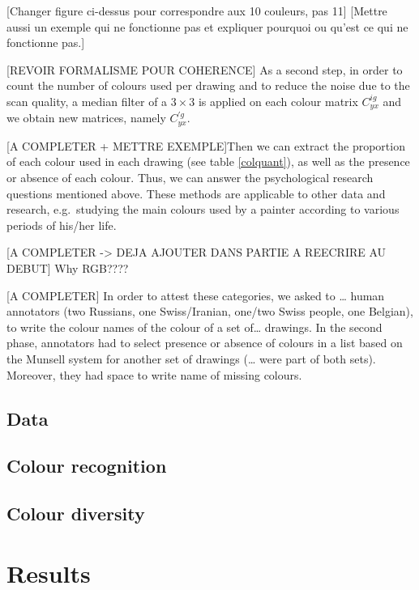 \documentclass[11pt,a4paper]{article}
\begin{document}
{[}Changer figure ci-dessus pour correspondre aux 10 couleurs, pas 11{]}
{[}Mettre aussi un exemple qui ne fonctionne pas et expliquer pourquoi
ou qu'est ce qui ne fonctionne pas.{]}

{[}REVOIR FORMALISME POUR COHERENCE{]} As a second step, in order to
count the number of colours used per drawing and to reduce the noise due
to the scan quality, a median filter of a \(3 \times 3\) is applied on
each colour matrix \(C_{yx}^{ig}\) and we obtain new matrices, namely
\(C_{yx}^{\prime g}\).

{[}A COMPLETER + METTRE EXEMPLE{]}Then we can extract the proportion of
each colour used in each drawing (see table \ref{colquant}), as well as
the presence or absence of each colour. Thus, we can answer the
psychological research questions mentioned above. These methods are
applicable to other data and research, e.g.~studying the main colours
used by a painter according to various periods of his/her life.

{[}A COMPLETER -\textgreater{} DEJA AJOUTER DANS PARTIE A REECRIRE AU
DEBUT{]} Why RGB????

{[}A COMPLETER{]} In order to attest these categories, we asked to
\ldots{} human annotators (two Russians, one Swiss/Iranian, one/two
Swiss people, one Belgian), to write the colour names of the colour of a
set of\ldots{} drawings. In the second phase, annotators had to select
presence or absence of colours in a list based on the Munsell system for
another set of drawings (\ldots{} were part of both sets). Moreover,
they had space to write name of missing colours.

\subsection{Data}
\subsection{Colour recognition}
\subsection{Colour diversity}

\section{Results}

\end{document}
